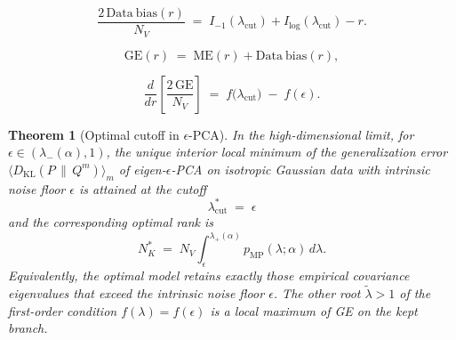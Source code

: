 \documentclass[10pt,a4paper]{amsart}
\newtheorem{theorem}{Theorem}
\newcommand{\KL}{D_{\mathrm{KL}}}
\newcommand{\NK}{N_K}
\newcommand{\NV}{N_V}
\newcommand{\PV}{P}
\newcommand{\QVm}{Q^{m}}
\begin{document}
\begin{equation}
  \frac{2\,\mathrm{Data\ bias}(r)}{\NV}
  \;=\;
  I_{-1}(\lambda_{\mathrm{cut}}) + I_{\log}(\lambda_{\mathrm{cut}}) - r .
  \label{eq:DB-r}
\end{equation}

\begin{equation}
  \mathrm{GE}(r) \;=\; \mathrm{ME}(r) + \mathrm{Data\ bias}(r) ,
  \label{eq:GE-decomp-asymp}
\end{equation}

\begin{equation}
  \frac{d}{dr}\!\left[\frac{2\,\mathrm{GE}}{\NV}\right]
  \;=\;
  f\!\big(\lambda_{\mathrm{cut}}\big) \;-\; f(\epsilon).
  \label{eq:dGEdr}
\end{equation}

\begin{theorem}[Optimal cutoff in $\epsilon$-PCA]
\label{thm:optimal-cutoff}
In the high-dimensional limit, for
$\epsilon \in (\lambda_{-}(\alpha), 1)$, the unique interior
local minimum of the generalization error
$\langle\KL(\PV \,\|\, \QVm)\rangle_{m}$ of
eigen-$\epsilon$-PCA on isotropic Gaussian data with intrinsic
noise floor $\epsilon$ is attained at the cutoff
\begin{equation}
  \boxed{\;\lambda_{\mathrm{cut}}^{*} \;=\; \epsilon\;}
  \label{eq:optcut}
\end{equation}
and the corresponding optimal rank is
\begin{equation}
  \NK^{*} \;=\; \NV \int_{\epsilon}^{\lambda_{+}(\alpha)}
                  p_{\mathrm{MP}}(\lambda;\alpha)\,d\lambda .
  \label{eq:NKopt}
\end{equation}
Equivalently, the optimal model retains exactly those empirical
covariance eigenvalues that exceed the intrinsic noise floor
$\epsilon$. The other root $\widetilde{\lambda} > 1$ of the
first-order condition $f(\lambda) = f(\epsilon)$ is a local
\emph{maximum} of GE on the kept branch.
\end{theorem}
\end{document}
